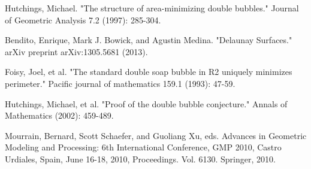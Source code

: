 \documentclass[a4paper,12pt]{report}
\begin{document}
\begin{thebibliography}{9}
Hutchings, Michael. "The structure of area-minimizing double bubbles." Journal of Geometric Analysis 7.2 (1997): 285-304.

Bendito, Enrique, Mark J. Bowick, and Agustin Medina. "Delaunay Surfaces." arXiv preprint arXiv:1305.5681 (2013).

Foisy, Joel, et al. "The standard double soap bubble in R2 uniquely minimizes perimeter." Pacific journal of mathematics 159.1 (1993): 47-59.

Hutchings, Michael, et al. "Proof of the double bubble conjecture." Annals of Mathematics (2002): 459-489.

Mourrain, Bernard, Scott Schaefer, and Guoliang Xu, eds. Advances in Geometric Modeling and Processing: 6th International Conference, GMP 2010, Castro Urdiales, Spain, June 16-18, 2010, Proceedings. Vol. 6130. Springer, 2010.

\end{thebibliography}
\end{document}
